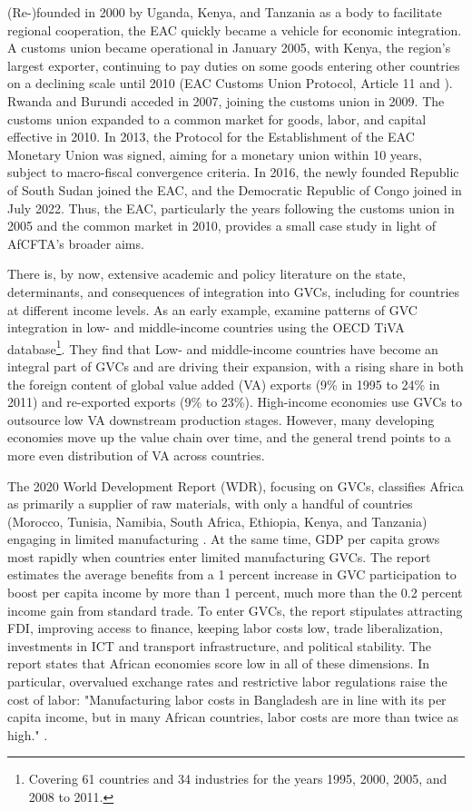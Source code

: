 \documentclass[a4paper]{article}
\begin{document}
(Re-)founded in 2000 by Uganda, Kenya, and Tanzania as a body to facilitate regional cooperation, the EAC quickly became a vehicle for economic integration. A customs union became operational in January 2005, with Kenya, the region's largest exporter, continuing to pay duties on some goods entering other countries on a declining scale until 2010 (EAC Customs Union Protocol, Article 11 and \citet{aloo2017free}). Rwanda and Burundi acceded in 2007, joining the customs union in 2009. The customs union expanded to a common market for goods, labor, and capital effective in 2010. In 2013, the Protocol for the Establishment of the EAC Monetary Union was signed, aiming for a monetary union within 10 years, subject to macro-fiscal convergence criteria. In 2016, the newly founded Republic of South Sudan joined the EAC, and the Democratic Republic of Congo joined in July 2022. Thus, the EAC, particularly the years following the customs union in 2005 and the common market in 2010, provides a small case study in light of AfCFTA's broader aims. \newline 

There is, by now, extensive academic and policy literature on the state, determinants, and consequences of integration into GVCs, including for countries at different income levels. As an early example, \citet{Kummritz20162} examine patterns of GVC integration in low- and middle-income countries using the OECD TiVA database\footnote{Covering 61 countries and 34 industries for the years 1995, 2000, 2005, and 2008 to 2011.}. They find that Low- and middle-income countries have become an integral part of GVCs and are driving their expansion, with a rising share in both the foreign content of global value added (VA) exports (9\% in 1995 to 24\% in 2011) and re-exported exports (9\% to 23\%). High-income economies use GVCs to outsource low VA downstream production stages. However, many developing economies move up the value chain over time, and the general trend points to a more even distribution of VA across countries. \newline 

The 2020 World Development Report (WDR), focusing on GVCs, classifies Africa as primarily a supplier of raw materials, with only a handful of countries (Morocco, Tunisia, Namibia, South Africa, Ethiopia, Kenya, and Tanzania) engaging in limited manufacturing \citep{world2020trading}. At the same time, GDP per capita grows most rapidly when countries enter limited manufacturing GVCs. The report estimates the average benefits from a 1 percent increase in GVC participation to boost per capita income by more than 1 percent, much more than the 0.2 percent income gain from standard trade. To enter GVCs, the report stipulates attracting FDI, improving access to finance, keeping labor costs low, trade liberalization, investments in ICT and transport infrastructure, and political stability. The report states that African economies score low in all of these dimensions. In particular, overvalued exchange rates and restrictive labor regulations raise the cost of labor: "Manufacturing labor costs in Bangladesh are in line with its per capita income, but in many African countries, labor costs are more than twice as high." \citep{world2020trading}. \newline
\end{document}
